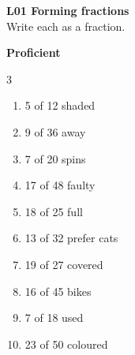 \documentclass[17pt,a4paper,landscape]{extarticle}
\begin{document}
\sffamily
\boldmath

\boldmath

\boldmath

\boldmath

\boldmath

\boldmath





{\LARGE \textbf{L01 Forming fractions}}\\[0.35em]
Write each as a fraction.

\vspace{2.6em}
{\LARGE \textbf{Proficient}}
\begin{multicols}{3}
\begin{enumerate}[
  itemsep=7.9em,
  label=\textbf{\arabic*.}, 
  labelwidth=2.2em,
  labelsep=0.75em,
  leftmargin=!,
  align=left
]
\item 5 of 12 shaded
\item 9 of 36 away
\item 7 of 20 spins
\item 17 of 48 faulty
\item 18 of 25 full
\item 13 of 32 prefer cats
\item 19 of 27 covered
\item 16 of 45 bikes
\item 7 of 18 used
\item 23 of 50 coloured
\end{enumerate}
\end{multicols}
\end{document}
